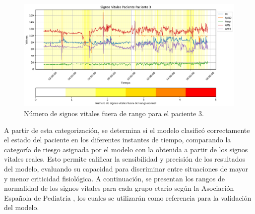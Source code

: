 \begin{figure}[H]
  \centering
  \includegraphics[width=\textwidth]{Images/patient3_signos_vitales_fuera_de_rango_2.png}
  \caption{Número de signos vitales fuera de rango para el paciente 3.}
  \label{fig:patient3_signos_vitales_fuera_de_rango}
\end{figure}

A partir de esta categorización, se determina si el modelo clasificó correctamente el estado del paciente en los diferentes instantes de tiempo, comparando la categoría de riesgo asignada por el modelo con la obtenida a partir de los signos vitales reales. Esto permite calificar la sensibilidad y precisión de los resultados del modelo, evaluando su capacidad para discriminar entre situaciones de mayor y menor criticidad fisiológica. A continuación, se presentan los rangos de normalidad de los signos vitales para cada grupo etario según la Asociación Española de Pediatría \parencite{aeped2020}, los cuales se utilizarán como referencia para la validación del modelo.

\begin{table}[H]
  \centering
  \caption{Rangos normales de signos vitales según grupo etario. ARTs: Presión arterial sistólica; ARTd: Presión arterial diastólica; FC: Frecuencia cardíaca; Resp: Frecuencia respiratoria; SpO$_2$: Saturación de oxígeno.}
  \label{tab:rangos_signos_vitales}
\end{table}

